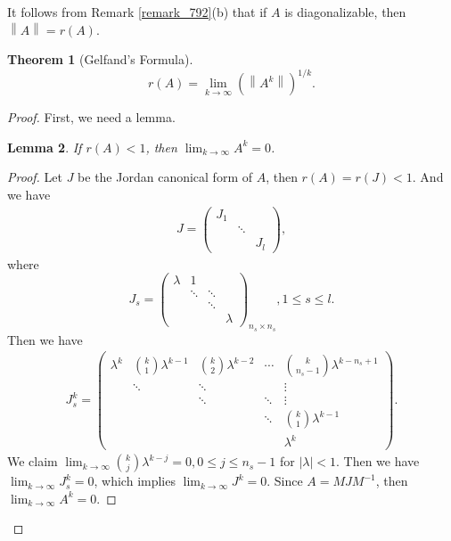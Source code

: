 \documentclass[10pt]{book}
\newtheorem{theorem}{Theorem}[chapter]
\newtheorem{lemma}[theorem]{Lemma}
\theoremstyle{definition}
\numberwithin{equation}{chapter}
\begin{document}
\medskip

It follows from Remark \ref{remark_792}(b) that if $A$ is diagonalizable, then $\left\|A\right\| = r(A)$.

\medskip

\begin{theorem}[Gelfand's Formula]\label{Gelfand_Formula}
$$r(A) = \lim_{k\to\infty} \left(\left\|A^k\right\|\right)^{1/k}. $$
\end{theorem}
\begin{proof}
First, we need a lemma.
\begin{lemma}\label{Gelfand_Formula_lemma}
If $r(A) < 1$, then $\lim_{k\to\infty}A^k = 0$.
\end{lemma}
\begin{proof}
Let $J$ be the Jordan canonical form of $A$, then $r(A) = r(J) < 1$. And we have 
\begin{align*}
    J =  \begin{pmatrix}
    J_1 &  &  \\
     & \ddots  &  \\
     &   & J_l
    \end{pmatrix},
\end{align*}
where $$J_s = \left(\begin{smallmatrix}
    \lambda & 1 &  & \\
     & \ddots  & \ddots & \\
     &   & \ddots &  \\
     &   &   & \lambda
\end{smallmatrix}\right)_{n_s\times n_s}, 1\leq s\leq l.$$
Then we have 
\begin{align*}
    J_s^k = \begin{pmatrix}
    \lambda^k & \binom{k}{1}\lambda^{k-1} & \binom{k}{2}\lambda^{k-2} & \cdots & \binom{k}{n_s-1} \lambda^{k - n_s +1} \\
     & \ddots  & \ddots &  & \vdots \\
     &         & \ddots &  \ddots & \vdots \\
     &         &        &  \ddots & \binom{k}{1}\lambda^{k-1} \\
     &         &        &         & \lambda^k
    \end{pmatrix}.
\end{align*}
We claim $\lim_{k\to\infty}\binom{k}{j}\lambda^{k-j} = 0, 0\leq j\leq n_s-1$ for $|\lambda| < 1$. Then we have $\lim_{k\to\infty} J_s^k = 0$, which implies $\lim_{k\to\infty} J^k = 0$. Since $A = MJM^{-1}$, then $\lim_{k\to\infty} A^k = 0$.
\end{proof}


\end{proof}
\end{document}
